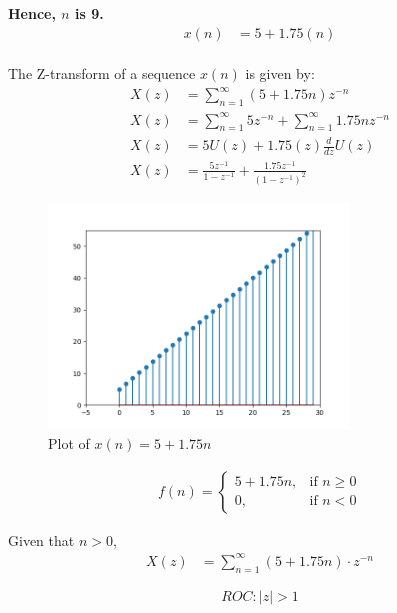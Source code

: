 \documentclass[journal,12pt,twocolumn]{IEEEtran}
\theoremstyle{remark}
\begin{document}
\begin{center}
\textbf{Hence, $n$ is 9.}
\vspace{1mm}
\begin{align}
x(n) &= 5 + 1.75(n)
\end{align}
\\The Z-transform of a sequence $x(n)$ is given by:
\begin{align}
  X(z) &= \sum_{n=1}^{\infty} (5 + 1.75n)z^{-n}  
  \\ X(z) &= \sum_{n=1}^{\infty} 5z^{-n} + \sum_{n=1}^{\infty} 1.75nz^{-n}
  \\ X(z) &= 5U(z) + 1.75(z)\frac{d}{dz} U(z)
  \\ X(z) &= \frac{5z^{-1}}{1-z^{-1}}+\frac{1.75z^{-1}}{(1-z^{-1})^{2}}
\end{align}
\begin{figure}
    \centering
    \includegraphics[width = 8cm]{figs/fig1.png}
    \caption{Plot of $x(n) = 5 + 1.75n$}
    \label{fig:enter-label}
\end{figure}

 \begin{align}
        f(n) = 
        \begin{cases}
            5 + 1.75n, & \text{if } n \geq 0 \\
            0, & \text{if } n < 0
        \end{cases}
    \end{align}

\vspace{4mm}
Given that \( n > 0 \),
    \begin{align}
    X(z) &= \sum_{n=1}^{\infty} (5 + 1.75n) \cdot z^{-n}
    \end{align}

\[ROC : |z| > 1\]

\end{center}
\end{document}
